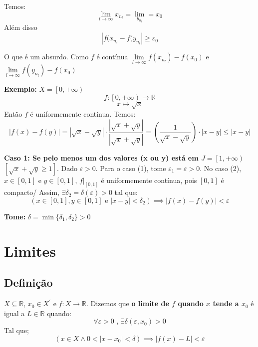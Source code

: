 \documentclass[12pt]{article}
\begin{document}
    Temos:
    \begin{equation*}
        \lim \limits_{l \to \infty} x_{n_l} = \lim \limits_{y_{n_l}} = x_0
    \end{equation*}
    Além disso
    \begin{equation*}
        |f(x_{n_l} - f(y_{n_l}| \geq \varepsilon_0
    \end{equation*}

    O que é um absurdo. Como $f$ é contínua $\lim \limits_{l \to \infty} f(x_{n_l}) - f(x_0)$ e $\lim \limits_{l \to \infty} f(y_{n_l}) - f(x_0)$

    \textbf{Exemplo: } $X = \left[ 0, + \infty \right)$
    \begin{equation*}
        f: \left[0, + \infty \right) \to \mathbb{R}
    \end{equation*}
    \begin{equation*}
        x \mapsto \sqrt{x}
    \end{equation*}
    Então $f$ é uniformemente contínua. Temos:
    \begin{equation*}
        |f(x) - f(y)| = |\sqrt{x} - \sqrt{{y}}| \cdot \frac{|\sqrt{x} + \sqrt{y}|}{|\sqrt{x} + \sqrt{y}|} = \left(\frac{1}{\sqrt{x} - \sqrt{y}}\right) \cdot |x-y| \leq |x-y|
    \end{equation*}
    
    \textbf{Caso 1: Se pelo menos um dos valores (x ou y) está em $J = \left[1, + \infty \right)$} $\left[\sqrt{x} + \sqrt{y} \geq 1 \right]$. Dado $\varepsilon > 0$. Para o caso (1), tome $\varepsilon_1 = \varepsilon>0$. No caso (2), $x \in \left[0, 1 \right]$ e $y \in \left[0, 1 \right]$, $f|_{\left[0,1\right]}$ é uniformemente contínua, pois $[0, 1]$ é compacto/ Assim, $\exists \delta_2 = \delta(\varepsilon) > 0$ tal que:
    \begin{equation*}
        \left(x \in [0,1], y \in [0,1] \text{ e } |x-y| < \delta_2 \right) \implies |f(x) - f(y)| < \varepsilon
    \end{equation*}

    \textbf{Tome: } $\delta = \min \{\delta_1, \delta_2 \} > 0$

    \section*{Limites}
    \subsection*{Definição}
    $X \subseteq \mathbb{R}$, $x_0 \in X^{\prime}$ e $f: X \to \mathbb{R}$. Dizemos que \textbf{o limite de $f$ quando $x$ tende a $x_0$} é igual a $L \in \mathbb{R}$ quando:
    \begin{equation*}
        \forall \varepsilon > 0 \text{ , } \exists \delta(\varepsilon, x_0) > 0
    \end{equation*}
    Tal que;
    \begin{equation*}
        \left( x \in X \land 0 < |x - x_0| < \delta \right) \implies |f(x) - L| < \varepsilon
    \end{equation*}
\end{document}
